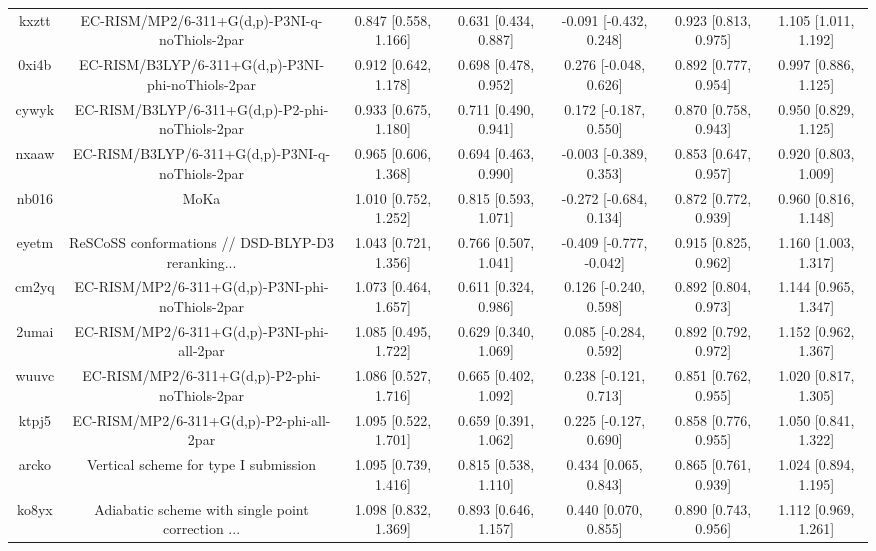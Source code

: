 \documentclass{article}
\begin{document}
\begin{center}
\begin{longtable}{|ccccccc|}
 kxztt &      EC-RISM/MP2/6-311+G(d,p)-P3NI-q-noThiols-2par &  0.847 [0.558, 1.166] &  0.631 [0.434, 0.887] &   -0.091 [-0.432, 0.248] &  0.923 [0.813, 0.975] &   1.105 [1.011, 1.192] \\
 0xi4b &  EC-RISM/B3LYP/6-311+G(d,p)-P3NI-phi-noThiols-2par &  0.912 [0.642, 1.178] &  0.698 [0.478, 0.952] &    0.276 [-0.048, 0.626] &  0.892 [0.777, 0.954] &   0.997 [0.886, 1.125] \\
 cywyk &    EC-RISM/B3LYP/6-311+G(d,p)-P2-phi-noThiols-2par &  0.933 [0.675, 1.180] &  0.711 [0.490, 0.941] &    0.172 [-0.187, 0.550] &  0.870 [0.758, 0.943] &   0.950 [0.829, 1.125] \\
 nxaaw &    EC-RISM/B3LYP/6-311+G(d,p)-P3NI-q-noThiols-2par &  0.965 [0.606, 1.368] &  0.694 [0.463, 0.990] &   -0.003 [-0.389, 0.353] &  0.853 [0.647, 0.957] &   0.920 [0.803, 1.009] \\
 nb016 &                                               MoKa &  1.010 [0.752, 1.252] &  0.815 [0.593, 1.071] &   -0.272 [-0.684, 0.134] &  0.872 [0.772, 0.939] &   0.960 [0.816, 1.148] \\
 eyetm &  ReSCoSS conformations // DSD-BLYP-D3 reranking... &  1.043 [0.721, 1.356] &  0.766 [0.507, 1.041] &  -0.409 [-0.777, -0.042] &  0.915 [0.825, 0.962] &   1.160 [1.003, 1.317] \\
 cm2yq &    EC-RISM/MP2/6-311+G(d,p)-P3NI-phi-noThiols-2par &  1.073 [0.464, 1.657] &  0.611 [0.324, 0.986] &    0.126 [-0.240, 0.598] &  0.892 [0.804, 0.973] &   1.144 [0.965, 1.347] \\
 2umai &         EC-RISM/MP2/6-311+G(d,p)-P3NI-phi-all-2par &  1.085 [0.495, 1.722] &  0.629 [0.340, 1.069] &    0.085 [-0.284, 0.592] &  0.892 [0.792, 0.972] &   1.152 [0.962, 1.367] \\
 wuuvc &      EC-RISM/MP2/6-311+G(d,p)-P2-phi-noThiols-2par &  1.086 [0.527, 1.716] &  0.665 [0.402, 1.092] &    0.238 [-0.121, 0.713] &  0.851 [0.762, 0.955] &   1.020 [0.817, 1.305] \\
 ktpj5 &           EC-RISM/MP2/6-311+G(d,p)-P2-phi-all-2par &  1.095 [0.522, 1.701] &  0.659 [0.391, 1.062] &    0.225 [-0.127, 0.690] &  0.858 [0.776, 0.955] &   1.050 [0.841, 1.322] \\
 arcko &              Vertical scheme for type I submission &  1.095 [0.739, 1.416] &  0.815 [0.538, 1.110] &     0.434 [0.065, 0.843] &  0.865 [0.761, 0.939] &   1.024 [0.894, 1.195] \\
 ko8yx &  Adiabatic scheme with single point correction ... &  1.098 [0.832, 1.369] &  0.893 [0.646, 1.157] &     0.440 [0.070, 0.855] &  0.890 [0.743, 0.956] &   1.112 [0.969, 1.261] \\

\end{longtable}
\end{center}
\end{document}
